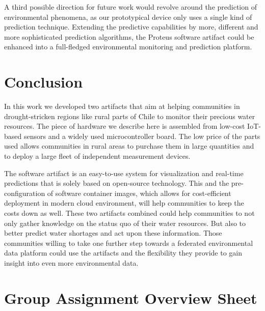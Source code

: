 \documentclass[11pt, letterpaper]{article}
\begin{document}
A third possible direction for future work would revolve around the prediction of environmental phenomena, as our prototypical device only uses a single kind of prediction technique. Extending the predictive capabilities by more, different and more sophisticated prediction algorithms, the Proteus software artifact could be enhanced into a full-fledged environmental monitoring and prediction platform.

\section{Conclusion}
In this work we developed two artifacts that aim at helping communities in drought-stricken regions like rural parts of Chile to monitor their precious water resources. The piece of hardware we describe here is assembled from low-cost IoT-based sensors and a widely used microcontroller board. The low price of the parts used allows communities in rural areas to purchase them in large quantities and to deploy a large fleet of independent measurement devices.
\newline

The software artifact is an easy-to-use system for visualization and real-time predictions that is solely based on open-source technology. This and the pre-configuration of software container images, which allows for cost-efficient deployment in modern cloud environment, will help communities to keep the costs down as well. These two artifacts combined could help communities to not only gather knowledge on the status quo of their water resources. But also to better predict water shortages and act upon these information. Those communities willing to take one further step towards a federated environmental data platform could use the artifacts and the flexibility they provide to gain insight into even more environmental data.



\appendix
\section{Group Assignment Overview Sheet}
\end{document}
